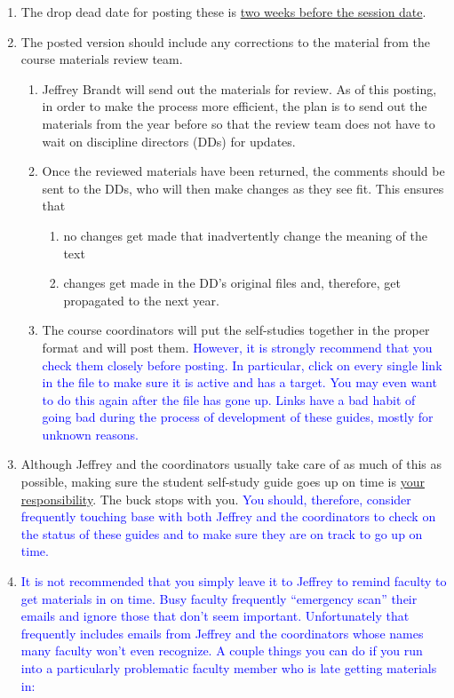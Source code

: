 \documentclass[11pt]{article}
\newcommand{\trsem}[1]{\textcolor{blue}{#1}}
\begin{document}
\begin{enumerate}
\item The drop dead date for posting these is \underline{two weeks before the session date}.
\item The posted version should include any corrections to the
    material from the course materials review team.
  \begin{enumerate}
  \item Jeffrey Brandt will send out the materials for review.  As of this posting, in order to make the process more efficient, the plan is to send out the materials from the year before so that the review team does not have to wait on discipline directors (DDs) for updates.
  \item Once the reviewed materials have been returned, the comments should be sent to the DDs, who will then make changes as they see fit.  This ensures that
    \begin{enumerate}
    \item no changes get made that inadvertently change the meaning of the text
    \item changes get made in the DD's original files and, therefore, get propagated to the next year.
    \end{enumerate}
  \item The course coordinators will put the self-studies together in the proper format and will post them.  \trsem{However, it is strongly recommend that you check them closely before posting.  In particular, click on every single link in the file to make sure it is active and has a target.  You may even want to do this again after the file has gone up.  Links have a bad habit of going bad during the process of development of these guides, mostly for unknown reasons.}
\end{enumerate}
\item Although Jeffrey and the coordinators usually take care of as much of this as possible, making sure the student self-study guide goes up on time is \underline{your responsibility}.  The buck stops with you.  \trsem{You should, therefore, consider frequently touching base with both Jeffrey and the coordinators to check on the status of these guides and to make sure they are on track to go up on time.}
  \def\labelenumi{\trsem{\arabic{enumi}.}}
\item \trsem{It is not recommended that you simply leave it to Jeffrey to remind faculty to get materials in on time.  Busy faculty frequently ``emergency scan'' their emails and ignore those that don't seem important.  Unfortunately that frequently includes emails from Jeffrey and the coordinators whose names many faculty won't even recognize.  A couple things you can do if you run into a particularly problematic faculty member who is late getting materials in:}

\end{enumerate}
\end{document}
